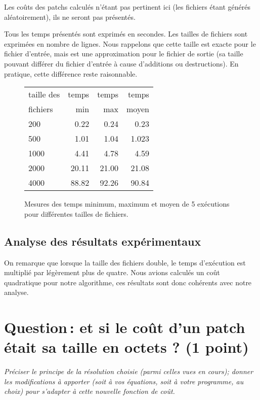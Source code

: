 \documentclass[a4paper, 10pt, french]{article}
\begin{document}
    Les coûts des patchs calculés n'étant pas pertinent ici (les fichiers étant
    générés aléatoirement), ils ne seront pas présentés.

    Tous les temps présentés sont exprimés en secondes. Les tailles de fichiers
    sont exprimées en nombre de lignes. Nous rappelons que cette taille est exacte
    pour le fichier d'entrée, mais est une approximation pour le fichier de sortie
    (sa taille pouvant différer du fichier d'entrée à cause d'additions ou destructions).
    En pratique, cette différence reste raisonnable.

    \begin{figure}[h]
      \begin{center}
        \begin{tabular}{|l||r|r|r||}
          \hline
          \hline
            taille des &   temps     & temps   & temps \\
            fichiers &   min       & max     & moyen \\
          \hline
          \hline
            200 &  0.22      &   0.24  &  0.23   \\
          \hline
            500 &  1.01      &   1.04  &  1.023   \\
          \hline
            1000 &   4.41     &  4.78   &  4.59   \\
          \hline
            2000 & 20.11   &  21.00   &  21.08   \\
          \hline
            4000 & 88.82  &    92.26   &  90.84  \\
          \hline
          \hline
        \end{tabular}
        \caption{Mesures des temps minimum, maximum et moyen de 5 exécutions pour différentes tailles de fichiers.}
        \label{table-temps}
      \end{center}
    \end{figure}

\subsection{Analyse des résultats expérimentaux}
On remarque que lorsque la taille des fichiers double, le temps d'exécution est
multiplié par légèrement plus de quatre. Nous avions calculés un coût quadratique
pour notre algorithme, ces résultats sont donc cohérents avec notre analyse.

\section{Question\,: et  si le coût d'un patch était sa taille en octets ? (1 point)}
{\em Préciser le principe de la résolution choisie (parmi celles vues en cours); donner  les modifications à apporter (soit à vos  équations, soit à votre programme, au choix)
pour s'adapter à cette nouvelle fonction de coût.
}
\end{document}
